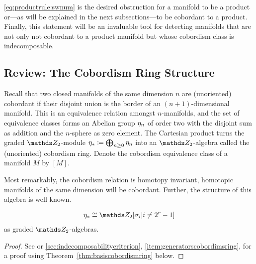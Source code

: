 \autoref{eq:productrule:swnum} is the desired obstruction for
a manifold to be a product or---as will be explained in the next
subsections---to be cobordant to a product.
Finally, this statement will be an invaluable tool for detecting
manifolds that are not only not cobordant to a product manifold but
whose cobordism class is indecomposable.

\subsection{Review: The Cobordism Ring Structure}
\label{sec:cobordismringstructure}
Recall that two closed manifolds of the same dimension $n$ are
(unoriented) cobordant if their disjoint union is the border of an
$(n+1)$-dimensional manifold.
This is an equivalence relation amongst $n$-manifolds, and the
set of equivalence classes forms an Abelian group $\eta_n$ of order two
with the disjoint sum as addition and the $n$-sphere as zero element.
The Cartesian product turns the graded $\Zmod2$-module
$\eta_*\coloneqq \bigoplus_{n\geq 0}\eta_n$ into an $\Zmod2$-algebra
called the (unoriented) cobordism ring.
Denote the cobordism equivalence class of a manifold $M$ by $[M]$.

Most remarkably, the cobordism relation is homotopy invariant, \idest
homotopic manifolds of the same dimension will be cobordant.
Further, the structure of this algebra is well-known.
\begin{Thm}[Thom]\label{thm:cobordismringstructure}
  \begin{gather*}
    \c_*
    \cong \Zmod2[\sigma_i| i\neq 2^r-1]
  \end{gather*}
  as graded $\Zmod2$-algebras.
  \begin{proof}
    See \cite[Theorem~IV.12]{thom} or
    \autoref{sec:indecomposabilitycriterion},
    \ref{item:generatorscobordimsring}, for a proof using
    Theorem~\ref{thm:basiscobordismring} below.
  \end{proof}
\end{Thm}

